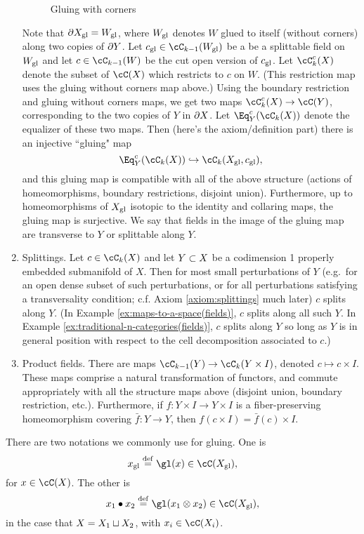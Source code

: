 \begin{enumerate}
\begin{figure}[t]
\begin{center}
\begin{tikzpicture}
\end{tikzpicture}
\end{center}
\caption{Gluing with corners}
\label{fig:gluing-with-corners}
\end{figure}
Note that $\bd X\sgl = W\sgl$, where $W\sgl$ denotes $W$ glued to itself
(without corners) along two copies of $\bd Y$.
Let $c\sgl \in \cC_{k-1}(W\sgl)$ be a be a splittable field on $W\sgl$ and let
$c \in \cC_{k-1}(W)$ be the cut open version of $c\sgl$.
Let $\cC^c_k(X)$ denote the subset of $\cC(X)$ which restricts to $c$ on $W$.
(This restriction map uses the gluing without corners map above.)
Using the boundary restriction and gluing without corners maps, 
we get two maps $\cC^c_k(X) \to \cC(Y)$, corresponding to the two
copies of $Y$ in $\bd X$.
Let $\Eq^c_Y(\cC_k(X))$ denote the equalizer of these two maps.
Then (here's the axiom/definition part) there is an injective ``gluing" map
\[
	\Eq^c_Y(\cC_k(X)) \hookrightarrow \cC_k(X\sgl, c\sgl) ,
\]
and this gluing map is compatible with all of the above structure (actions
of homeomorphisms, boundary restrictions, disjoint union).
Furthermore, up to homeomorphisms of $X\sgl$ isotopic to the identity
and collaring maps,
the gluing map is surjective.
We say that fields in the image of the gluing map
are transverse to $Y$ or splittable along $Y$.
\item Splittings.
Let $c\in \cC_k(X)$ and let $Y\sub X$ be a codimension 1 properly embedded submanifold of $X$.
Then for most small perturbations of $Y$ (e.g.\ for an open dense
subset of such perturbations, or for all perturbations satisfying
a transversality condition; c.f. Axiom \ref{axiom:splittings} much later) $c$ splits along $Y$.
(In Example \ref{ex:maps-to-a-space(fields)}, $c$ splits along all such $Y$.
In Example \ref{ex:traditional-n-categories(fields)}, $c$ splits along $Y$ so long as $Y$ 
is in general position with respect to the cell decomposition
associated to $c$.)
\item Product fields.
There are maps $\cC_{k-1}(Y) \to \cC_k(Y \times I)$, denoted
$c \mapsto c\times I$.
These maps comprise a natural transformation of functors, and commute appropriately
with all the structure maps above (disjoint union, boundary restriction, etc.).
Furthermore, if $f: Y\times I \to Y\times I$ is a fiber-preserving homeomorphism
covering $\bar{f}:Y\to Y$, then $f(c\times I) = \bar{f}(c)\times I$.
\end{enumerate}

There are two notations we commonly use for gluing.
One is 
\[
	x\sgl \deq \gl(x) \in \cC(X\sgl) , 
\]
for $x\in\cC(X)$.
The other is
\[
	x_1\bullet x_2 \deq \gl(x_1\otimes x_2) \in \cC(X\sgl) , 
\]
in the case that $X = X_1 \du X_2$, with $x_i \in \cC(X_i)$.

